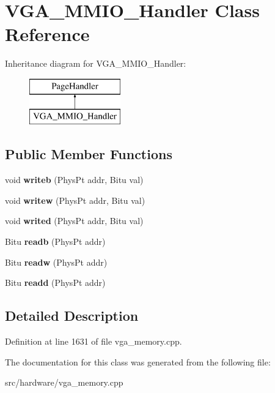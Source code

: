 \hypertarget{classVGA__MMIO__Handler}{\section{V\-G\-A\-\_\-\-M\-M\-I\-O\-\_\-\-Handler Class Reference}
\label{classVGA__MMIO__Handler}
}
Inheritance diagram for V\-G\-A\-\_\-\-M\-M\-I\-O\-\_\-\-Handler\-:\begin{figure}[H]
\begin{center}
\leavevmode
\includegraphics[height=2.000000cm]{classVGA__MMIO__Handler}
\end{center}
\end{figure}
\subsection*{Public Member Functions}
\begin{DoxyCompactItemize}
\item 
\hypertarget{classVGA__MMIO__Handler_a779662658a576ce1bd9aa3179e424495}{void {\bfseries writeb} (Phys\-Pt addr, Bitu val)}\label{classVGA__MMIO__Handler_a779662658a576ce1bd9aa3179e424495}

\item 
\hypertarget{classVGA__MMIO__Handler_a25ce81cdbb53959e45187ab1ac650cb2}{void {\bfseries writew} (Phys\-Pt addr, Bitu val)}\label{classVGA__MMIO__Handler_a25ce81cdbb53959e45187ab1ac650cb2}

\item 
\hypertarget{classVGA__MMIO__Handler_a60397669cf87d269153e5d1554cc16c4}{void {\bfseries writed} (Phys\-Pt addr, Bitu val)}\label{classVGA__MMIO__Handler_a60397669cf87d269153e5d1554cc16c4}

\item 
\hypertarget{classVGA__MMIO__Handler_aefab83f4a14d5626418aa371839e426f}{Bitu {\bfseries readb} (Phys\-Pt addr)}\label{classVGA__MMIO__Handler_aefab83f4a14d5626418aa371839e426f}

\item 
\hypertarget{classVGA__MMIO__Handler_a96360a3e09a8373dcb7a01266b3aa82e}{Bitu {\bfseries readw} (Phys\-Pt addr)}\label{classVGA__MMIO__Handler_a96360a3e09a8373dcb7a01266b3aa82e}

\item 
\hypertarget{classVGA__MMIO__Handler_a4fed3f110d17dda1ffb040a0e979f5cc}{Bitu {\bfseries readd} (Phys\-Pt addr)}\label{classVGA__MMIO__Handler_a4fed3f110d17dda1ffb040a0e979f5cc}

\end{DoxyCompactItemize}


\subsection{Detailed Description}


Definition at line 1631 of file vga\-\_\-memory.\-cpp.



The documentation for this class was generated from the following file\-:\begin{DoxyCompactItemize}
\item 
src/hardware/vga\-\_\-memory.\-cpp\end{DoxyCompactItemize}
